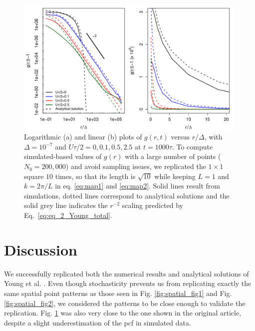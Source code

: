 \begin{figure}[H]
\begin{center}
 \includegraphics[width=0.99\textwidth]{../code/figure/pcf_test_Utot_modif_dx_dp.pdf}
 \caption{Logarithmic (a) and linear (b) plots of $g(r,t)$ versus $r/\Delta$, with $\Delta=10^{-7}$ and $U\tau/2=0,0.1,0.5,2.5$ at $t=1000\tau$. To compute simulated-based values of $g(r)$ with a large number of points ($N_0=200,000$) and avoid sampling issues, we replicated the $1\times 1$ square $10$ times, so that its length is $\sqrt{10}$ while keeping $L=1$ and $k=2\pi/L$ in eq. \ref{eq:map1} and \ref{eq:map2}. Solid lines result from simulations, dotted lines correspond to analytical solutions and the solid grey line indicates the $r^{-2}$ scaling predicted by Eq.~\ref{eq:eq_2_Young_total}.}
  \label{fig:pcf_Fig3}
\end{center}
  \end{figure} 
 
\section*{Discussion}

We successfully replicated both the numerical results and analytical solutions of Young et al. \citep{young_reproductive_2001}. Even though stochasticity prevents us from replicating exactly the same spatial point patterns as those seen in Fig. \ref{fig:spatial_fig1} and Fig. \ref{fig:spatial_fig2}, we considered the patterns to be close enough to validate the replication. Fig. \ref{fig:pcf_Fig3} was also very close to the one shown in the original article, despite a slight underestimation of the pcf in simulated data.\\

